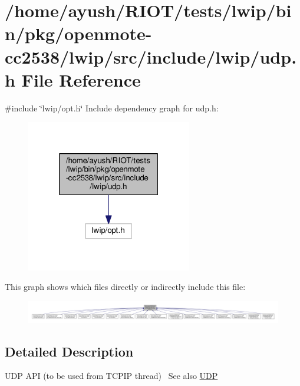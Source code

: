 \hypertarget{openmote-cc2538_2lwip_2src_2include_2lwip_2udp_8h}{}\section{/home/ayush/\+R\+I\+O\+T/tests/lwip/bin/pkg/openmote-\/cc2538/lwip/src/include/lwip/udp.h File Reference}
\label{openmote-cc2538_2lwip_2src_2include_2lwip_2udp_8h}
{\ttfamily \#include \char`\"{}lwip/opt.\+h\char`\"{}}\newline
Include dependency graph for udp.\+h\+:
\nopagebreak
\begin{figure}[H]
\begin{center}
\leavevmode
\includegraphics[width=205pt]{openmote-cc2538_2lwip_2src_2include_2lwip_2udp_8h__incl}
\end{center}
\end{figure}
This graph shows which files directly or indirectly include this file\+:
\nopagebreak
\begin{figure}[H]
\begin{center}
\leavevmode
\includegraphics[width=350pt]{openmote-cc2538_2lwip_2src_2include_2lwip_2udp_8h__dep__incl}
\end{center}
\end{figure}


\subsection{Detailed Description}
U\+DP A\+PI (to be used from T\+C\+P\+IP thread)~\newline
See also \hyperlink{group__udp__raw}{U\+DP} 